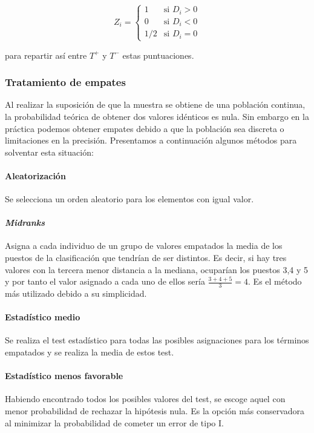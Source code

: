 	\[ Z_i = \left\lbrace \begin{array}{ll}
	 				1 & \text{si } D_i > 0 \\
	 				0 & \text{si } D_i < 0 \\
	 				1/2 & \text{si } D_i = 0 
	 		\end{array} \right. 					\]
	
	para repartir así entre $T^+$ y $T^-$ estas puntuaciones. 
	
\subsubsection{Tratamiento de empates}
	
	Al realizar la suposición de que la muestra se obtiene de una población continua, la probabilidad teórica de obtener dos valores idénticos es nula. Sin embargo en la práctica podemos obtener empates debido a que la población sea discreta o limitaciones en la precisión. Presentamos a continuación algunos métodos para solventar esta situación:
	
\paragraph{Aleatorización} Se selecciona un orden aleatorio para los elementos con igual valor.

\paragraph{\textit{Midranks}} Asigna a cada individuo de un grupo de valores empatados la media de los puestos de la clasificación que tendrían de ser distintos. Es decir, si hay tres valores con la tercera menor distancia a la mediana, ocuparían los puestos 3,4 y 5 y por tanto el valor asignado a cada uno de ellos sería $\frac{3+4+5}{3}=4$. Es el método más utilizado debido a su simplicidad. 

\paragraph{Estadístico medio} Se realiza el test estadístico para todas las posibles asignaciones para los términos empatados y se realiza la media de estos test.

\paragraph{Estadístico menos favorable} Habiendo encontrado todos los posibles valores del test, se escoge aquel con menor probabilidad de rechazar la hipótesis nula. Es la opción más conservadora al minimizar la probabilidad de cometer un error de tipo I.

